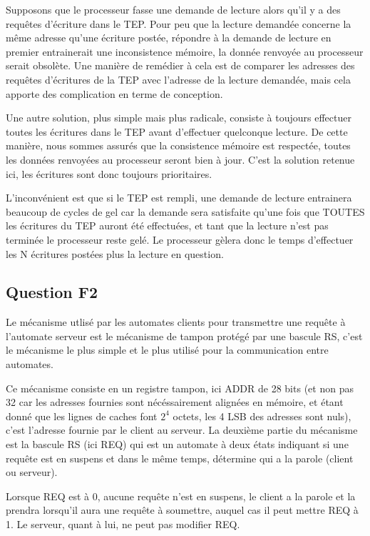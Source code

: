 \documentclass{article}
\begin{document}
Supposons que le processeur fasse une demande de lecture alors qu'il y a des
requêtes d'écriture dans le TEP. Pour peu que la lecture demandée concerne la
même adresse qu'une écriture postée, répondre à la demande de lecture en premier
entrainerait une inconsistence mémoire, la donnée renvoyée au processeur serait
obsolète. Une manière de remédier à cela est de comparer les adresses des
requêtes d'écritures de la TEP avec l'adresse de la lecture demandée, mais cela
apporte des complication en terme de conception.

Une autre solution, plus
simple mais plus radicale, consiste à toujours effectuer toutes les écritures
dans le TEP avant d'effectuer quelconque lecture. De cette manière, nous sommes
assurés que la consistence mémoire est respectée, toutes les données renvoyées
au processeur seront bien à jour. C'est la solution retenue ici, les écritures
sont donc toujours prioritaires.

L'inconvénient est que si le TEP est rempli, une demande de lecture entrainera
beaucoup de cycles de gel car la demande sera satisfaite qu'une fois que TOUTES
les écritures du TEP auront été effectuées, et tant que la lecture n'est pas
terminée le processeur reste gelé. Le processeur gèlera donc le temps
d'effectuer les N écritures postées plus la lecture en question.

\subsection{Question F2}

Le mécanisme utlisé par les automates clients pour transmettre une requête
à l'automate serveur est le mécanisme de tampon protégé par une bascule RS,
c'est le mécanisme le plus simple et le plus utilisé pour la communication
entre automates.

Ce mécanisme consiste en un registre tampon, ici ADDR de 28 bits
(et non pas 32 car les adresses fournies sont nécéssairement alignées en
mémoire, et étant donné que les lignes de caches font $2^4$ octets, les 4 LSB
des adresses sont nuls), c'est l'adresse fournie par le client au serveur.
La deuxième partie du mécanisme est la bascule RS (ici REQ) qui est un automate
à deux états indiquant si une requête est en suspens et dans le même temps,
détermine qui a la parole (client ou serveur).

Lorsque REQ est à 0, aucune requête n'est en suspens, le client a la parole et
la prendra lorsqu'il aura une requête à soumettre, auquel cas il peut mettre
REQ à 1. Le serveur, quant à lui, ne peut pas modifier REQ.
\end{document}
